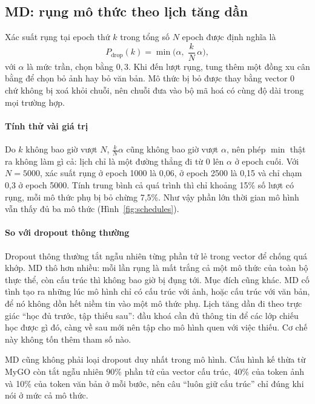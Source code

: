 \documentclass[conference,a4paper]{IEEEtran}
\begin{document}
\subsection{MD: rụng mô thức theo lịch tăng dần}
\label{sec:mdbgf-md}

Xác suất rụng tại epoch thứ $k$ trong tổng số $N$ epoch được định nghĩa là
\begin{equation}
P_{\mathrm{drop}}(k) = \min\!\Big(\alpha,\; \frac{k}{N}\,\alpha\Big),
\label{eq:pdrop}
\end{equation}
với $\alpha$ là mức trần, chọn bằng $0{,}3$. Khi đến lượt rụng, tung thêm một đồng xu cân bằng để chọn bỏ ảnh hay bỏ văn bản. Mô thức bị bỏ được thay bằng vector 0 chứ không bị xoá khỏi chuỗi, nên chuỗi đưa vào bộ mã hoá có cùng độ dài trong mọi trường hợp.

\paragraph{Tính thử vài giá trị} Do $k$ không bao giờ vượt $N$, $\frac{k}{N}\alpha$ cũng không bao giờ vượt $\alpha$, nên phép $\min$ thật ra không làm gì cả: lịch chỉ là một đường thẳng đi từ 0 lên $\alpha$ ở epoch cuối. Với $N = 5000$, xác suất rụng ở epoch 1000 là 0{,}06, ở epoch 2500 là 0{,}15 và chỉ chạm 0{,}3 ở epoch 5000. Tính trung bình cả quá trình thì chỉ khoảng 15\% số lượt có rụng, mỗi mô thức phụ bị bỏ chừng 7{,}5\%. Như vậy phần lớn thời gian mô hình vẫn thấy đủ ba mô thức (Hình~\ref{fig:schedules}).

\paragraph{So với dropout thông thường} Dropout thông thường tắt ngẫu nhiên từng phần tử lẻ trong vector để chống quá khớp. MD thô hơn nhiều: mỗi lần rụng là mất trắng cả một mô thức của toàn bộ thực thể, còn cấu trúc thì không bao giờ bị đụng tới. Mục đích cũng khác. MD cố tình tạo ra những lúc mô hình chỉ có cấu trúc với ảnh, hoặc cấu trúc với văn bản, để nó không dồn hết niềm tin vào một mô thức phụ. Lịch tăng dần đi theo trực giác ``học đủ trước, tập thiếu sau'': đầu khoá cần đủ thông tin để các lớp chiếu học được gì đó, càng về sau mới nên tập cho mô hình quen với việc thiếu. Cơ chế này không tốn thêm tham số nào.

MD cũng không phải loại dropout duy nhất trong mô hình. Cấu hình kế thừa từ MyGO còn tắt ngẫu nhiên 90\% phần tử của vector cấu trúc, 40\% của token ảnh và 10\% của token văn bản ở mỗi bước, nên câu ``luôn giữ cấu trúc'' chỉ đúng khi nói ở mức cả mô thức.
\end{document}
